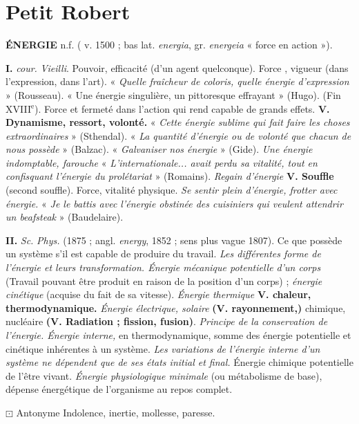 \section{Petit Robert}

{\bf ÉNERGIE} {\sf n.f.} ( v. 1500 ; bas lat. {\it energia}, gr. {\it energeia} « force en action »).

{\bf I.} {\it cour.}  {\it Vieilli}. Pouvoir, efficacité (d'un agent quelconque). \lb Force , vigueur (dans l'expression, dans l'art). « {\it Quelle fraîcheur de coloris, quelle énergie d'expression} » ({\sc Rousseau}). « Une énergie singulière, un pittoresque effrayant » ({\sc Hugo}).
%
(Fin {\footnotesize XVIII}$^\text{e}$). Force et fermeté dans l'action qui rend capable de grands effets. {\bf V. Dynamisme, ressort, volonté.} « {\it Cette énergie sublime qui fait faire les choses extraordinaires} » ({\sc Sthendal}). « {\it La quantité d'énergie ou de volonté que chacun de nous possède} » ({\sc Balzac}). « {\it Galvaniser nos énergie} » ({\sc Gide}). {\it Une énergie indomptable, farouche} « {\it L'internationale... avait perdu sa vitalité, tout en confisquant l'énergie du prolétariat} » ({\sc Romains}). {\it Regain d'énergie} {\bf V. Souffle} (second souffle). \lb Force, vitalité physique. {\it Se sentir plein d'énergie, frotter avec énergie.} « {\it Je le battis avec l'énergie obstinée des cuisiniers qui veulent attendrir un beafsteak} » ({\sc Baudelaire}).

{\bf II.} {\it Sc.}  {\it Phys.} (1875 ; angl. {\it energy}, 1852 ; sens plus vague 1807). Ce que possède un système s'il est capable de produire du travail. {\it Les différentes forme de l'énergie et leurs transformation. Énergie mécanique potentielle d'un corps} (Travail pouvant être produit en raison de la position d'un corps) ; {\it énergie cinétique} (acquise du fait de sa vitesse). {\it Énergie thermique} {\bf V. chaleur, thermodynamique.} {\it Énergie électrique, solaire} {\bf (V. rayonnement,)} chimique, nucléaire  {\bf (V. Radiation ; fission, fusion)}. {\it Principe de la conservation de l'énergie. Énergie interne,} en thermodynamique, somme des énergie potentielle et cinétique inhérentes à un système. {\it Les variations de l'énergie interne d'un système ne dépendent que de ses états initial et final.}  Énergie chimique potentielle de l'être vivant. {\it Énergie physiologique minimale} (ou métabolisme de base), dépense énergétique de l'organisme au repos complet.

$\boxdot$ {\sc Antonyme} \si{Indolence, inertie, mollesse, paresse.}

